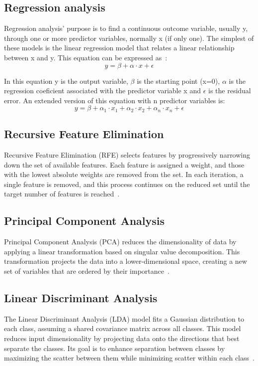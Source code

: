 \subsection{Regression analysis}

Regression analysis' purpose is to find a continuous outcome variable, usually y, through one or more predictor variables, normally x (if only one). The simplest of these models is the 
linear regression model that relates a linear relationship between x and y. This equation can be expressed as~\cite{bachelorInsole}:
\[ y = \beta + \alpha \cdot x + \epsilon \]

In this equation y is the output variable, $\beta$ is the starting point (x=0), $\alpha$ is the regression coeficient associated with the predictor variable x and $\epsilon$ is the residual error.
An extended version of this equation with n predictor variables is:
\[ y = \beta + \alpha_1 \cdot x_1 + \alpha_2 \cdot x_2 + \alpha_n \cdot x_n + \epsilon \]

\subsection{Recursive Feature Elimination}
\label{ssec:recursive_feature_elimination}

Recursive Feature Elimination (RFE) selects features by progressively narrowing down the set of available features. Each feature is assigned a weight, and those with the lowest absolute 
weights are removed from the set. In each iteration, a single feature is removed, and this process continues on the reduced set until the target number of features is reached~\cite{porto}.


\subsection{Principal Component Analysis}
\label{ssec:principal_component_analysis}

Principal Component Analysis (PCA) reduces the dimensionality of data by applying a linear transformation based on singular value decomposition. This transformation projects the data 
into a lower-dimensional space, creating a new set of variables that are ordered by their importance~\cite{porto}.


\subsection{Linear Discriminant Analysis}
\label{ssec:linear_discriminant_analysis}

The Linear Discriminant Analysis (LDA) model fits a Gaussian distribution to each class, assuming a shared covariance matrix across all classes. This model reduces input dimensionality 
by projecting data onto the directions that best separate the classes. Its goal is to enhance separation between classes by maximizing the scatter between them while minimizing scatter 
within each class~\cite{porto}.


